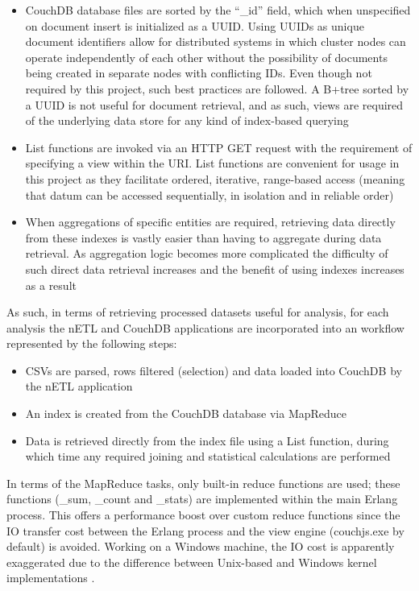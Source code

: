 \begin{itemize}
    \item CouchDB database files are sorted by the ``\_id'' field, which when unspecified on document insert is initialized as a UUID. Using UUIDs as unique document identifiers allow for distributed systems in which cluster nodes can operate independently of each other without the possibility of documents being created in separate nodes with conflicting IDs. Even though not required by this project, such best practices are followed. A B+tree sorted by a UUID is not useful for document retrieval, and as such, views are required of the underlying data store for any kind of index-based querying
    \item List functions are invoked via an HTTP GET request with the requirement of specifying a view within the URI. List functions are convenient for usage in this project as they facilitate ordered, iterative, range-based access (meaning that datum can be accessed sequentially, in isolation and in reliable order)
    \item When aggregations of specific entities are required, retrieving data directly from these indexes is vastly easier than having to aggregate during data retrieval. As aggregation logic becomes more complicated the difficulty of such direct data retrieval increases and the benefit of using indexes increases as a result
\end{itemize}

As such, in terms of retrieving processed datasets useful for analysis, for each analysis the nETL and CouchDB applications are incorporated into an workflow represented by the following steps:

\begin{itemize}
    \item CSVs are parsed, rows filtered (selection) and data loaded into CouchDB by the nETL application
    \item An index is created from the CouchDB database via MapReduce
    \item Data is retrieved directly from the index file using a List function, during which time any required joining and statistical calculations are performed
\end{itemize}

In terms of the MapReduce tasks, only built-in reduce functions are used; these functions (\_sum, \_count and \_stats) are implemented within the main Erlang process. This offers a performance boost over custom reduce functions since the IO transfer cost between the Erlang process and the view engine (couchjs.exe by default) is avoided. Working on a Windows machine, the IO cost is apparently exaggerated due to the difference between Unix-based and Windows kernel implementations \cite{slack1Nov}.

